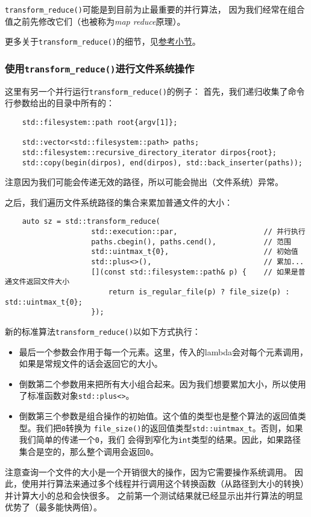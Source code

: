 \texttt{transform\_reduce()}可能是到目前为止最重要的并行算法，
因为我们经常在组合值之前先修改它们（也被称为\emph{map reduce}原理）。

更多关于\texttt{transform\_reduce()}的细节，见\hyperref[ch23.2.2]{参考小节}。

\subsubsection{使用\texttt{transform\_reduce()}进行文件系统操作}\label{ch22.6.1.4}
这里有另一个并行运行\texttt{transform\_reduce()}的例子：
首先，我们递归收集了命令行参数给出的目录中所有的：
\begin{lstlisting}
    std::filesystem::path root{argv[1]};

    std::vector<std::filesystem::path> paths;
    std::filesystem::recursive_directory_iterator dirpos{root};
    std::copy(begin(dirpos), end(dirpos), std::back_inserter(paths));
\end{lstlisting}
注意因为我们可能会传递无效的路径，所以可能会抛出（文件系统）异常。

之后，我们遍历文件系统路径的集合来累加普通文件的大小：
\begin{lstlisting}
    auto sz = std::transform_reduce(
                    std::execution::par,                    // 并行执行
                    paths.cbegin(), paths.cend(),           // 范围
                    std::uintmax_t{0},                      // 初始值
                    std::plus<>(),                          // 累加...
                    [](const std::filesystem::path& p) {    // 如果是普通文件返回文件大小
                        return is_regular_file(p) ? file_size(p) : std::uintmax_t{0};
                    });
\end{lstlisting}
新的标准算法\texttt{transform\_reduce()}以如下方式执行：
\begin{itemize}
    \item 最后一个参数会作用于每一个元素。这里，传入的lambda会对每个元素调用，
    如果是常规文件的话会返回它的大小。
    \item 倒数第二个参数用来把所有大小组合起来。因为我们想要累加大小，所以使用了标准函数对象\texttt{std::plus<>}。
    \item 倒数第三个参数是组合操作的初始值。这个值的类型也是整个算法的返回值类型。我们把\texttt{0}转换为
    \texttt{file\_size()}的返回值类型\texttt{std::uintmax\_t}。否则，如果我们简单的传递一个\texttt{0}，我们
    会得到窄化为\texttt{int}类型的结果。因此，如果路径集合是空的，那么整个调用会返回\texttt{0}。
\end{itemize}
注意查询一个文件的大小是一个开销很大的操作，因为它需要操作系统调用。
因此，使用并行算法来通过多个线程并行调用这个转换函数（从路径到大小的转换）并计算大小的总和会快很多。
之前第一个测试结果就已经显示出并行算法的明显优势了（最多能快两倍）。

